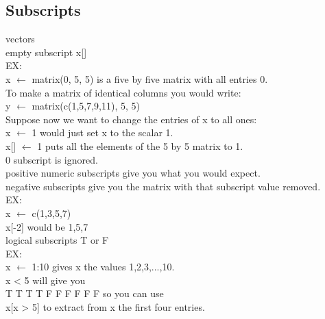 \documentclass{article}
\begin{document}
\subsection{Subscripts}
vectors\\
empty subscript x[]\\
EX:\\
x $\leftarrow$ matrix(0, 5, 5) is a five by five matrix with all entries 0.\\
To make a matrix of identical columns you would write:\\
y $\leftarrow$ matrix(c(1,5,7,9,11), 5, 5)\\
Suppose now we want to change the entries of x to all ones:\\
x $\leftarrow$ 1 would just set x to the scalar 1.\\
x[] $\leftarrow$ 1 puts all the elements of the 5 by 5 matrix to 1.\\
0 subscript is ignored.\\
positive numeric subscripts give you what you would expect.\\
negative subscripts give you the matrix with that subscript value removed.\\
EX:\\
x $\leftarrow$ c(1,3,5,7)\\
x[-2] would be 1,5,7\\
logical subscripts T or F\\
EX:\\
x $\leftarrow$ 1:10  gives x the values 1,2,3,...,10.\\
x < 5 will give you \\
T T T T F F F F F F  so you can use\\
x[x > 5] to extract from x the first four entries.
\end{document}
